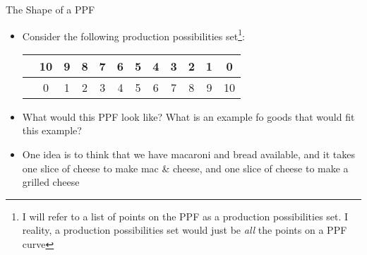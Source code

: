 \documentclass[10pt,xcolor={svgnames}]{beamer}
\begin{document}
\begin{frame}{The Shape of a PPF}
\begin{itemize}[<+->]
    \item Consider the following production possibilities set\footnote{I will refer to a list of points on the PPF as a production possibilities set. I reality, a production possibilities set would just be \textit{all} the points on a PPF curve}:
    \begin{table}[]
        \centering
        \begin{tabular}{|c|ccccccccccc|}
        \hline
            \hspace{8mm} & 10&9&8&7&6&5&4&3&2&1&0 \\
            \hline
            \hspace{8mm} & 0&1&2&3&4&5&6&7&8&9&10\\
            \hline
        \end{tabular}
    \end{table}
    \item What would this PPF look like? What is an example fo goods that would fit this example?\vspace{30mm} 
    
    \item One idea is to think that we have macaroni and bread available, and it takes one slice of cheese to make mac \& cheese, and one slice of cheese to make a grilled cheese
\end{itemize}
\end{frame}
\end{document}
